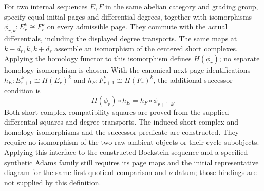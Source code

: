\begin{definition}
  \label{def:pagewise-sequence-comparison}
  \leanok
  For two internal sequences $E,F$ in the same abelian category and grading
  group, specify equal initial pages and differential degrees, together with
  isomorphisms $\phi_{r,k}:E_r^k\cong F_r^k$ on every admissible page.
  They commute with the actual differentials, including the displayed
  degree transports. The same maps at $k-d_r,k,k+d_r$ assemble an
  isomorphism of the centered short complexes. Applying the homology
  functor to this isomorphism defines $H(\phi_r)$; no separate homology
  isomorphism is chosen.
  With the canonical next-page identifications
  $h_E:E_{r+1}^k\cong H(E_r)^k$ and
  $h_F:F_{r+1}^k\cong H(F_r)^k$, the additional successor condition is
  \[
    H(\phi_r)\circ h_E=h_F\circ\phi_{r+1,k}.
  \]
  Both short-complex compatibility squares are proved from the supplied
  differential squares and degree transports. The induced short-complex
  and homology isomorphisms and the successor predicate are constructed.
  They require no isomorphism of the two raw ambient objects or their cycle
  subobjects. Applying this interface to the constructed Bockstein sequence
  and a specified synthetic Adams family still requires its page maps and
  the initial representative diagram for the same first-quotient comparison
  and $\nu$ datum; those bindings are not supplied by this definition.
\end{definition}

